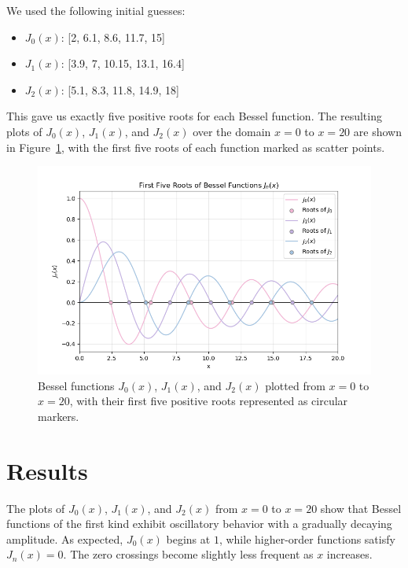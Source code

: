 \documentclass[linenumbers, twocolumn]{aastex631}
\begin{document}
\noindent We used the following initial guesses:
\begin{itemize}
    \item $J_0(x)$: [2, 6.1, 8.6, 11.7, 15]
    \item $J_1(x)$: [3.9, 7, 10.15, 13.1, 16.4]
    \item $J_2(x)$: [5.1, 8.3, 11.8, 14.9, 18]
\end{itemize}

\noindent This gave us exactly five positive roots for each Bessel function. The 
resulting plots of $J_0(x)$, $J_1(x)$, and $J_2(x)$ over the domain $x=0$ to
$x=20$ are shown in Figure~\ref{fig:bessel_roots}, with the first five roots of
each function marked as scatter points.

\begin{figure}[H]
    \centering
    \includegraphics[width=1.0\linewidth]{bessel_roots.png}
    \caption{Bessel functions $J_0(x)$, $J_1(x)$, and $J_2(x)$ plotted from $x=0$ to
    $x=20$, with their first five positive roots represented as circular markers.}
    \label{fig:bessel_roots}
\end{figure}


\section{Results} \label{sec:results}

The plots of $J_0(x)$, $J_1(x)$, and $J_2(x)$ from $x=0$ to $x=20$ show that
Bessel functions of the first kind exhibit oscillatory behavior with a gradually
decaying amplitude. As expected, $J_0(x)$ begins at $1$, while higher-order
functions satisfy $J_n(x)=0$. The zero crossings become slightly less
frequent as $x$ increases.
\end{document}

